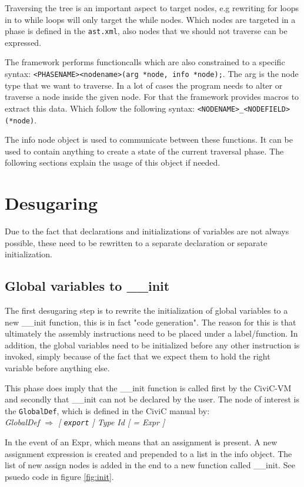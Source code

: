 \documentclass[a4paper]{article}
\begin{document}
Traversing the tree is an important aspect to target nodes, e.g rewriting for
loops in to while loops will only target the while nodes. Which nodes are
targeted in a phase is defined in the \texttt{ast.xml}, also nodes that we
should not traverse can be expressed.

The framework performs functioncalls which are also constrained to a specific
syntax: \texttt{<PHASENAME><nodename>(arg *node, info *node);}. The arg is the
node type that we want to traverse. In a lot of cases the program needs to
alter or traverse a node inside the given node. For that the framework provides
macros to extract this data. Which follow the following syntax:
\texttt{<NODENAME>\_<NODEFIELD>(*node)}.

The info node object is used to communicate between these functions. It can be
used to contain anything to create a state of the current traversal phase. The
following sections explain the usage of this object if needed.

\section{Desugaring}
Due to the fact that declarations and initializations of variables are not
always possible, these need to be rewritten to a separate declaration or separate
initialization.

\subsection{Global variables to \_\_init}
The first desugaring step is to rewrite the initialization of global variables
to a new \_\_init function, this is in fact "code generation". The reason for
this is that ultimately the assembly instructions need to be placed under a
label/function. In addition, the global variables need to be initialized before any
other instruction is invoked, simply because of the fact that we expect them to
hold the right variable before anything else.

This phase does imply that the \_\_init function is called first by the
CiviC-VM and secondly that \_\_init can not be declared by the user.
The node of interest is the \texttt{GlobalDef}, which is defined in the CiviC
manual by:\\
\textit{GlobalDef $\Rightarrow$ [ \texttt{export} ] Type Id [ = Expr ]}

In the event of an Expr, which means that an assignment is present. A new
assignment expression is created and prepended to a list in the info object.
The list of new assign nodes is added in the end to a new function called
\_\_init. See psuedo code in figure \ref{fig:init}.
\end{document}
